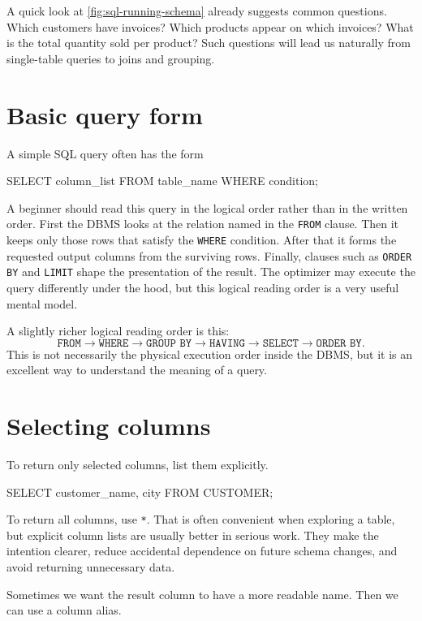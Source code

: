 \documentclass[11pt,a4paper,openany]{book}
\begin{document}
A quick look at \cref{fig:sql-running-schema} already suggests common questions. Which customers have invoices? Which products appear on which invoices? What is the total quantity sold per product? Such questions will lead us naturally from single-table queries to joins and grouping.

\section{Basic query form}
A simple SQL query often has the form

\begin{codesql}
SELECT column_list
FROM table_name
WHERE condition;
\end{codesql}

A beginner should read this query in the logical order rather than in the written order. First the DBMS looks at the relation named in the \texttt{FROM} clause. Then it keeps only those rows that satisfy the \texttt{WHERE} condition. After that it forms the requested output columns from the surviving rows. Finally, clauses such as \texttt{ORDER BY} and \texttt{LIMIT} shape the presentation of the result. The optimizer may execute the query differently under the hood, but this logical reading order is a very useful mental model.

A slightly richer logical reading order is this:
\[
\texttt{FROM} \rightarrow \texttt{WHERE} \rightarrow \texttt{GROUP BY} \rightarrow \texttt{HAVING} \rightarrow \texttt{SELECT} \rightarrow \texttt{ORDER BY}.
\]
This is not necessarily the physical execution order inside the DBMS, but it is an excellent way to understand the meaning of a query.

\section{Selecting columns}
To return only selected columns, list them explicitly.

\begin{codesql}
SELECT customer_name, city
FROM CUSTOMER;
\end{codesql}

To return all columns, use \texttt{*}. That is often convenient when exploring a table, but explicit column lists are usually better in serious work. They make the intention clearer, reduce accidental dependence on future schema changes, and avoid returning unnecessary data.

Sometimes we want the result column to have a more readable name. Then we can use a column alias.
\end{document}
